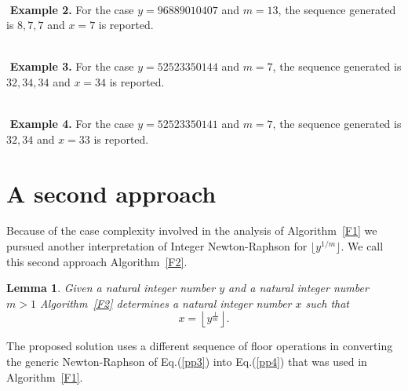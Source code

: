 \documentclass[11pt]{article}
\newtheorem{lem}{Lemma}
\newcommand{\floor}[1]{\lfloor #1 \rfloor}
\begin{document}
$ $ \\ $ $
{\bf Example 2.}
For the case $y=96889010407$ and $m=13$,
the sequence generated is $8,7,7$ 
and $x=7$ is reported.

$ $ \\ $ $
{\bf Example 3.}
For the case $y=52523350144$ and $m=7$,
the sequence generated is $32,34,34$
and $x=34$ is reported.

$ $ \\ $ $
{\bf Example 4.}
For the case $y=52523350141$ and $m=7$,
the sequence generated is $32,34$
and $x=33$ is reported.




\section{A second approach}

Because of the case complexity involved in the analysis
of Algorithm~\ref{F1} we pursued another interpretation of
Integer Newton-Raphson for $\floor{y^{1/m}}$.
We call this second approach Algorithm~\ref{F2}.

\begin{lem}
Given a natural integer number $y$ and
a natural integer number $m>1$ Algorithm~\ref{F2}
determines a natural integer number $x$ such that
\[
    x = \left\lfloor y^{\frac{1}{m}} \right\rfloor .
\]
\end{lem}

The proposed solution uses a different sequence of
floor operations in converting the generic Newton-Raphson
of Eq.(\ref{pp3}) into Eq.(\ref{pp4}) that was
used in  Algorithm~\ref{F1}.
\end{document}

